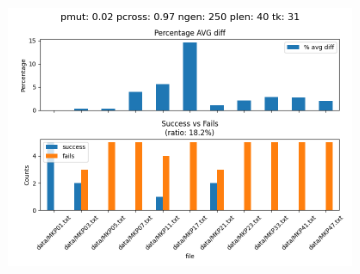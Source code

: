 \begin{figure}[H]
\begin{subfigure}{.3\textwidth}
        \includegraphics[width=\textwidth]{img/tuning/tuning_results_2_97_250_40_31.png}
    \end{subfigure}\\


\end{figure}
